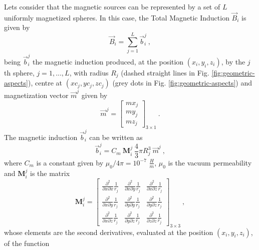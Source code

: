 \documentclass[journal abbreviation, npg]{copernicus}
\begin{document}
Lets consider that the magnetic sources can be represented by a set of $L$ uniformly magnetized spheres. In this case, the Total Magnetic Induction $\vec{B}_i$ is given by
\begin{equation}
\vec{B}_i = \sum_{j = 1}^{L} \vec{b}_{i}^{j} \: ,
\label{eq:total-induction-i}
\end{equation}
being $\vec{b}^{j}_{i}$ the magnetic induction produced, at the position $(x_{i}, y_{i}, z_{i})$, by the $j$th sphere, $j = 1, ..., L$, with radius $R_ {j}$ (dashed straight lines in Fig. \ref{fig:geometric-aspects}), centre at $(xc_{j}, yc_{j}, zc_{j})$ (grey dots in Fig. \ref{fig:geometric-aspects}) and magnetization vector $\vec{m}^{j}$ given by
\begin{equation}
\vec{m}^{j} =
\left[
\begin{array}{c}
mx_{j} \\
my_{j} \\
mz_{j}
\end{array}
\right]_ {3 \times 1} \: .
\label{eq:mag-vector-j}
\end{equation}
The magnetic induction $\vec{b}^{j}_{i}$ can be written as
\begin{equation}
\vec{b}^{j}_{i} = C_{m} \: \mathbf{M}_{i}^{j} \: 
                  \dfrac{4}{3} \pi R_{j}^{3} \:
                  \vec{m}^{j} \: ,
\label{eq:j-induction-i}
\end{equation}
where $C_{m}$ is a constant given by $\mu_{0} / {4 \pi}=10^{-7}$ $\frac{H}{m}$, $\mu_{0}$ is the vacuum permeability and $\mathbf{M}_{i}^{j}$ is the matrix 
\begin{equation}
\mathbf{M}^{j}_{i} =
\left[
\begin{array}{ccc}
\frac{\partial^{2}}{\partial x \partial x} \frac{1}{r_{j}} &
\frac{\partial^{2}}{\partial x \partial y} \frac{1}{r_{j}} &
\frac{\partial^{2}}{\partial x \partial z} \frac{1}{r_{j}} \\
\frac{\partial^{2}}{\partial x \partial y} \frac{1}{r_{j}} &
\frac{\partial^{2}}{\partial y \partial y} \frac{1}{r_{j}} &
\frac{\partial^{2}}{\partial y \partial z} \frac{1}{r_{j}} \\
\frac{\partial^{2}}{\partial x \partial z} \frac{1}{r_{j}} &
\frac{\partial^{2}}{\partial y \partial z} \frac{1}{r_{j}} &
\frac{\partial^{2}}{\partial z \partial z} \frac{1}{r_{j}}
\end{array}
\right]_{3 \times 3} \: ,
\label{eq:matrix-Mij}
\end{equation}
whose elements are the second derivatives, evaluated at the position $(x_{i}, y_{i}, z_{i})$, of the function
\end{document}

